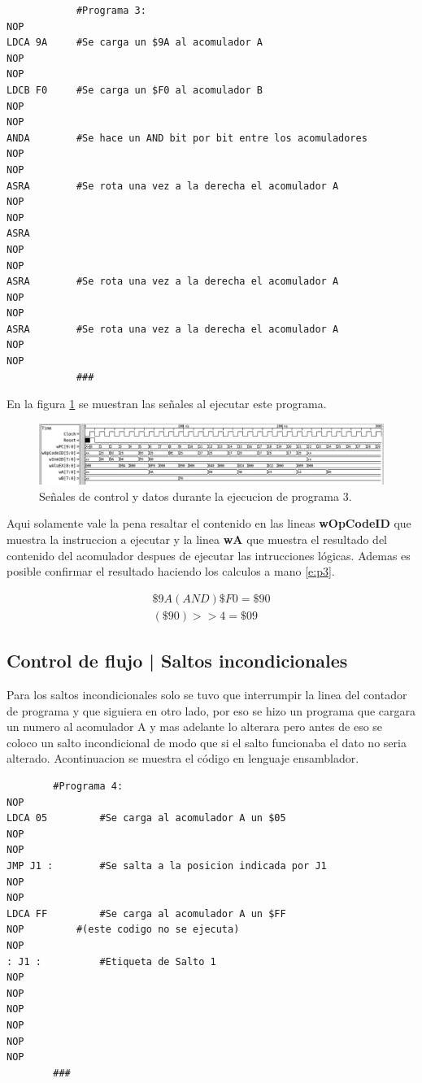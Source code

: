 \documentclass[paper=letter, fontsize=12pt]{article}
\begin{document}
\begin{lstlisting}
			#Programa 3:
NOP
LDCA 9A		#Se carga un $9A al acomulador A
NOP
NOP
LDCB F0		#Se carga un $F0 al acomulador B
NOP
NOP
ANDA		#Se hace un AND bit por bit entre los acomuladores
NOP
NOP
ASRA		#Se rota una vez a la derecha el acomulador A
NOP
NOP
ASRA
NOP
NOP
ASRA		#Se rota una vez a la derecha el acomulador A
NOP
NOP
ASRA		#Se rota una vez a la derecha el acomulador A
NOP
NOP
			###
\end{lstlisting}

En la figura \ref{i:p3} se muestran las señales al ejecutar este programa.\\

\begin{figure}[hbtp]
\centering
\includegraphics[width=1\linewidth]{../media/Prog3.png}
\caption{Señales de control y datos durante la ejecucion de programa 3.}
\label{i:p3}
\end{figure}

Aqui solamente vale la pena resaltar el contenido en las lineas \textbf{wOpCodeID} que muestra la instruccion a ejecutar y la linea \textbf{wA} que muestra el resultado del contenido del acomulador despues de ejecutar las intrucciones lógicas. Ademas es posible confirmar el resultado haciendo los calculos a mano \ref{e:p3}.

\begin{align} 
\label{e:p3}
\$9A  (AND) \$F0 = \$90 \\
(\$90) >> 4 = \$09
\end{align}


\subsection{Control de flujo | Saltos incondicionales}

Para los saltos incondicionales solo se tuvo que interrumpir la linea del contador de programa y que siguiera en otro lado, por eso se hizo un programa que cargara un numero al acomulador A y mas adelante lo alterara pero antes de eso se coloco un salto incondicional de modo que si el salto funcionaba el dato no seria alterado. Acontinuacion se muestra el código en lenguaje ensamblador.

\begin{lstlisting}
		#Programa 4:
NOP
LDCA 05			#Se carga al acomulador A un $05
NOP
NOP
JMP J1 :		#Se salta a la posicion indicada por J1
NOP
NOP
LDCA FF			#Se carga al acomulador A un $FF
NOP			#(este codigo no se ejecuta)
NOP
: J1 :			#Etiqueta de Salto 1
NOP
NOP
NOP
NOP
NOP
NOP
		###
\end{lstlisting}
\end{document}
